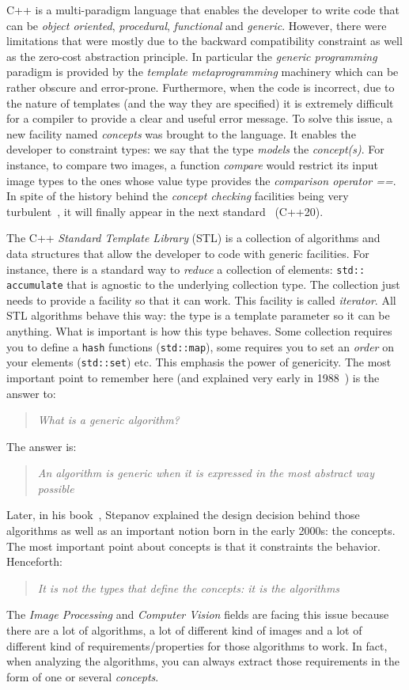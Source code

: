 C++ is a multi-paradigm language that enables the developer to write code that can be \emph{object oriented},
\emph{procedural}, \emph{functional} and \emph{generic}. However, there were limitations that were mostly due to the
backward compatibility constraint as well as the zero-cost abstraction principle. In particular the \emph{generic
  programming} paradigm is provided by the \emph{template metaprogramming} machinery which can be rather obscure and
error-prone. Furthermore, when the code is incorrect, due to the nature of templates (and the way they are specified) it
is extremely difficult for a compiler to provide a clear and useful error message. To solve this issue, a new facility
named \emph{concepts} was brought to the language. It enables the developer to constraint types: we say that the type
\emph{models} the \emph{concept(s)}. For instance, to compare two images, a function \emph{compare} would restrict its
input image types to the ones whose value type provides the \emph{comparison operator ==}. In spite of the history
behind the \emph{concept checking} facilities being very
turbulent~\parencite{seymour.2009.concepts,stroustrup.2003.concepts,sutton.2017.concepts}, it will finally appear in the
next standard~\cite{voutilainen.2017.concepts} (C++20).

The C++ \emph{Standard Template Library} (STL) is a collection of algorithms and data structures that allow the
developer to code with generic facilities. For instance, there is a standard way to \emph{reduce} a collection of
elements: \texttt{std:: accumulate} that is agnostic to the underlying collection type. The collection just needs to
provide a facility so that it can work. This facility is called \emph{iterator}. All STL algorithms behave this way: the
type is a template parameter so it can be anything. What is important is how this type behaves. Some collection requires
you to define a \texttt{hash} functions (\texttt{std::map}), some requires you to set an \emph{order} on your elements
(\texttt{std::set}) etc. This emphasis the power of genericity. The most important point to remember here (and explained
very early in 1988~\cite{musser.1988.generic}) is the answer to: \blockquote{\emph{What is a generic algorithm?}}. The
answer is: \blockquote{\emph{An algorithm is generic when it is expressed in the most abstract way possible}}. Later, in
his book~\cite{stepanov.2009.elements}, Stepanov explained the design decision behind those algorithms as well as an
important notion born in the early 2000s: the concepts. The most important point about concepts is that it constraints
the behavior. Henceforth: \blockquote{\emph{It is not the types that define the concepts: it is the algorithms}}. The
\emph{Image Processing} and \emph{Computer Vision} fields are facing this issue because there are a lot of algorithms, a
lot of different kind of images and a lot of different kind of requirements/properties for those algorithms to work. In
fact, when analyzing the algorithms, you can always extract those requirements in the form of one or several
\emph{concepts}.

